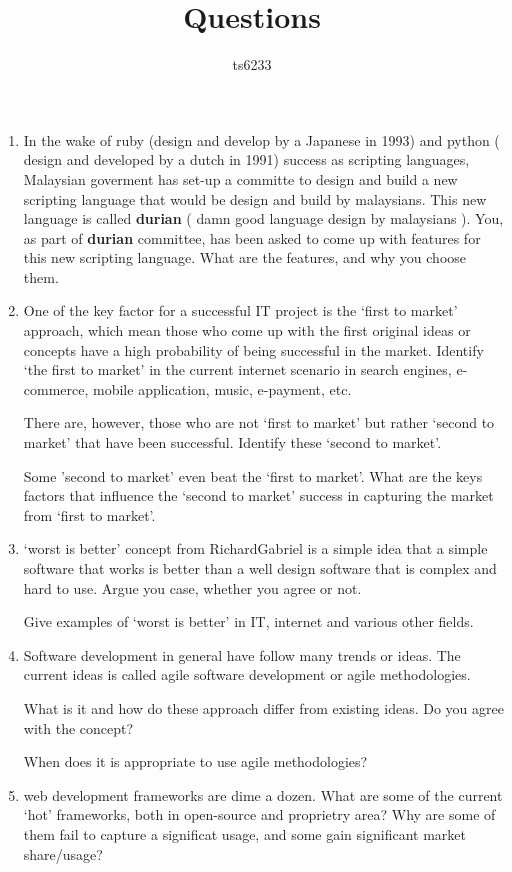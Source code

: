 \documentclass[12pt]{article}
\title{Questions}
\author{ts6233}
\date{}
\begin{document}
\begin{enumerate}
\item In the wake of ruby (design and develop by a Japanese in 1993) and python ( design and developed by a dutch in 1991) success as scripting languages, Malaysian goverment has set-up a committe to design and build a new scripting language that would be design and build by malaysians. This new language is called \textbf{durian} ( damn good language design by malaysians ). You, as part of \textbf{durian} committee, has been asked to come up with features for this new scripting language. What are the features, and why you choose them.

\item One of the key factor for a  successful IT project is the `first to market' approach, which mean those who come up with the first original ideas or concepts have a high probability of being successful in the market. Identify `the first to market' in the current internet scenario in search engines, e-commerce, mobile application, music, e-payment, etc.

There are, however, those who are not `first to market' but rather `second to market' that have been successful. Identify these `second to market'.

Some 'second to market' even beat the `first to market'. 
What are the keys factors that influence the `second to market' success in capturing the market from `first to market'.

\item `worst is better' concept from RichardGabriel is a simple idea that a simple software that works is better than a well design software  that is complex and hard to use. Argue you case, whether you agree or not.

Give examples of `worst is better' in IT, internet and various other fields.

\item Software development in general have follow many trends or ideas. The current ideas is called agile software development or agile methodologies.

What is it and how do these approach differ from existing ideas. Do you agree with the concept?

When does it is appropriate to use agile methodologies?

\item web development frameworks are dime a dozen. What are some of the current `hot' frameworks, both in open-source and proprietry area?  Why are some of them fail to capture a significat usage, and some gain significant market share/usage?

\end{enumerate}
\end{document}
